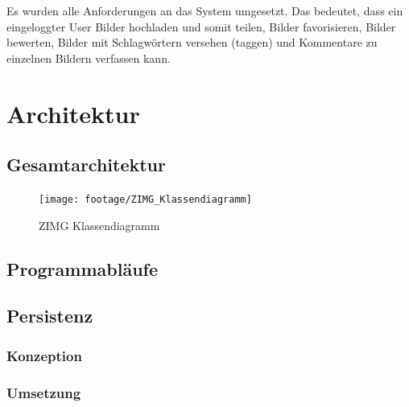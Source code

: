 \documentclass[12pt, oneside, a4paper]{article}		%
\begin{document}
 Es wurden alle Anforderungen an das System umgesetzt. Das bedeutet, dass ein eingeloggter User Bilder hochladen und somit teilen, Bilder favorisieren, Bilder bewerten, Bilder mit Schlagwörtern versehen (taggen) und Kommentare zu einzelnen Bildern verfassen kann.

\section{Architektur}

\subsection{Gesamtarchitektur}

\begin{figure}[H]
 	\centering
 	\texttt{[image: footage/ZIMG\_Klassendiagramm]} 
 	\caption{ZIMG Klassendiagramm}
	\label{ZIMGClassDiagram}
 \end{figure}

\subsection{Programmabläufe}
\blindtext

\subsection{Persistenz}
\blindtext

\subsubsection{Konzeption}
\blindtext

\subsubsection{Umsetzung}
\blindtext
\end{document}
